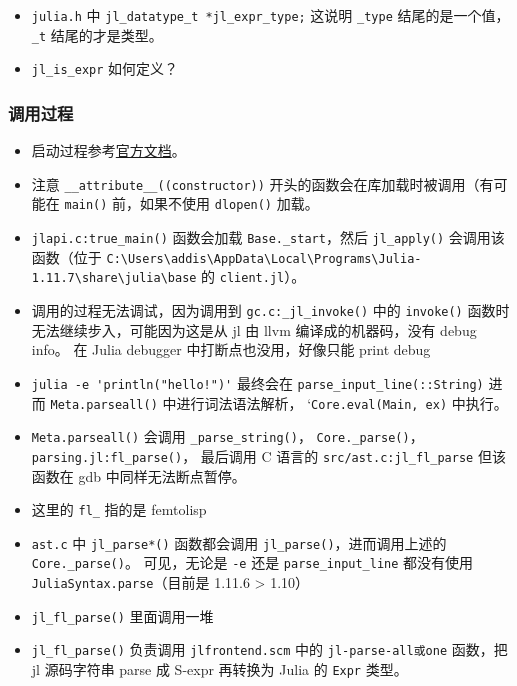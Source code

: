 \begin{itemize}
\begin{lstlisting}[language=cpp]
    // followed by alignment padding and inline data, or owner pointer
} jl_array_t;
\end{lstlisting}
\verb`jl_array_len()` 可以获取长度， \verb`ajl_array_ptr_ref()` 可以获取矩阵元

\item \verb`julia.h` 中 \verb`jl_datatype_t *jl_expr_type;` 这说明 \verb`_type` 结尾的是一个值，\verb`_t` 结尾的才是类型。
\item \verb`jl_is_expr` 如何定义？
\end{itemize}


\subsubsection{调用过程}
\begin{itemize}
\item 启动过程参考\href{https://docs.julialang.org/en/v1/devdocs/init/}{官方文档}。
\item 注意 \verb`__attribute__((constructor))` 开头的函数会在库加载时被调用（有可能在 \verb`main()` 前，如果不使用 \verb`dlopen()` 加载。
\item \verb`jlapi.c:true_main()` 函数会加载 \verb`Base._start`，然后 \verb`jl_apply()` 会调用该函数（位于 \verb`C:\Users\addis\AppData\Local\Programs\Julia-1.11.7\share\julia\base` 的 \verb`client.jl`）。
\item 调用的过程无法调试，因为调用到 \verb`gc.c:_jl_invoke()` 中的 \verb`invoke()` 函数时无法继续步入，可能因为这是从 jl 由 llvm 编译成的机器码，没有 debug info。 在 Julia debugger 中打断点也没用，好像只能 print debug
\item \verb`julia -e 'println("hello!")'` 最终会在 \verb`parse_input_line(::String)` 进而 \verb`Meta.parseall()` 中进行词法语法解析， `\verb`Core.eval(Main, ex)` 中执行。
\item \verb`Meta.parseall()` 会调用 \verb`_parse_string()`， \verb`Core._parse()`， \verb`parsing.jl:fl_parse()`， 最后调用 C 语言的 \verb`src/ast.c:jl_fl_parse` 但该函数在 gdb 中同样无法断点暂停。
\item 这里的 \verb`fl_` 指的是 femtolisp
\item \verb`ast.c` 中 \verb`jl_parse*()` 函数都会调用 \verb`jl_parse()`，进而调用上述的 \verb`Core._parse()`。 可见，无论是 \verb`-e` 还是 \verb`parse_input_line` 都没有使用 \verb`JuliaSyntax.parse`（目前是 1.11.6 > 1.10）
\item \verb`jl_fl_parse()` 里面调用一堆
\item \verb`jl_fl_parse()` 负责调用 \verb`jlfrontend.scm` 中的 \verb`jl-parse-all或one` 函数，把 jl 源码字符串 parse 成 S-expr 再转换为 Julia 的 \verb`Expr` 类型。
\end{itemize}

